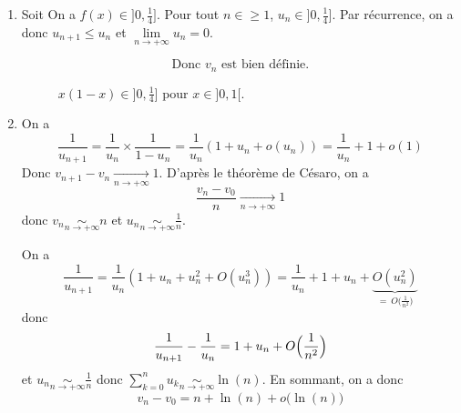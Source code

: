 \begin{solution}
	\phantom{}
	\begin{enumerate}
		\item Soit \function{f}{]0,1[}{\R}{x}{x(1-x)}
		On a $f(x)\in]0,\frac{1}{4}]$. Pour tout $n\in\geqslant1$, $u_{n}\in]0,\frac{1}{4}]$. Par récurrence, on a donc $u_{n+1}\leqslant u_{n}$ et $\lim\limits_{n\to+\infty}u_{n}=0$. 
		
		$$\boxed{\text{Donc }v_{n}\text{ est bien définie.}}$$

		\begin{figure}[!ht]
			\centering
			\caption{$x(1-x)\in\bigl]0,\frac{1}{4}\bigr]$ pour $x\in]0,1[$.}
		\end{figure}

		\item On a 
		$$\frac{1}{u_{n+1}}=\frac{1}{u_{n}}\times\frac{1}{1-u_{n}}=\frac{1}{u_{n}}(1+u_{n}+o(u_{n}))=\frac{1}{u_{n}}+1+o(1)$$
		Donc $v_{n+1}-v_{n}\xrightarrow[n\to+\infty]{}1$. D'après le théorème de Césaro, on a 
		$$\frac{v_{n}-v_{0}}{n}\xrightarrow[n\to+\infty]{}1$$
		donc $v_{n}\underset{n\to+\infty}{\sim}n$ et $u_{n}\underset{n\to+\infty}{\sim}\frac{1}{n}$.

		On a 
		$$\frac{1}{u_{n+1}}=\frac{1}{u_{n}}(1+u_{n}+u_{n}^{2}+O(u_{n}^{3}))=\frac{1}{u_{n}}+1+u_{n}+\underbrace{O(u_{n}^{2})}_{=~O\bigl(\frac{1}{n^{2}}\bigr)}$$
		donc 
		$$\frac{1}{u_{n+1}}-\frac{1}{u_{n}}=1+u_{n}+O\Bigl(\frac{1}{n^{2}}\Bigr)$$
		et $u_{n}\underset{n\to+\infty}{\sim}\frac{1}{n}$ donc $\sum_{k=0}^{n}u_{k}\underset{n\to+\infty}{\sim}\ln(n)$. En sommant, on a donc 
		$$v_{n}-v_{0}=n+\ln(n)+o\bigl(\ln(n)\bigr)$$


\end{enumerate}
\end{solution}
